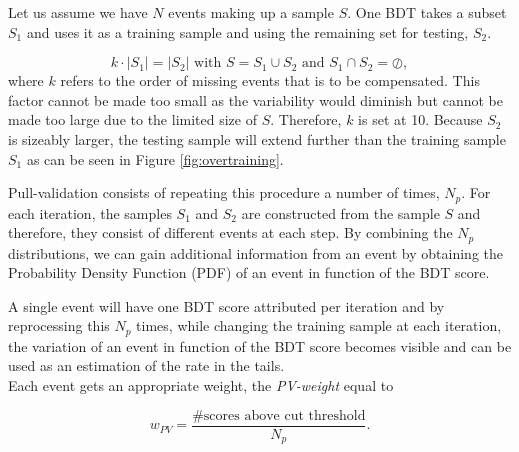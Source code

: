 \noindent Let us assume we have $N$ events making up a sample $S$. One BDT takes a subset $S_1$ and uses it as a training sample and using the remaining set for testing, $S_2$. 

\begin{equation}
k \cdot \left| S_1 \right| = \left| S_2 \right| \textrm{ with } S = S_1 \cup S_2 \textrm{ and } S_1 \cap S_2 = \oslash, 
\end{equation}
where $k$ refers to the order of missing events that is to be compensated. This factor cannot be made too small as the variability would diminish but cannot be made too large due to the limited size of $S$. Therefore, $k$ is set at 10. Because $S_2$ is sizeably larger, the testing sample will extend further than the training sample $S_1$ as can be seen in Figure \ref{fig:overtraining}. 

Pull-validation consists of repeating this procedure a number of times, $N_p$. For each iteration, the samples $S_1$ and $S_2$ are constructed from the sample $S$ and therefore, they consist of different events at each step. By combining the $N_p$ distributions, we can gain additional information from an event by obtaining the Probability Density Function (PDF) of an event in function of the BDT score. 

A single event will have one BDT score attributed per iteration and by reprocessing this $N_p$ times, while changing the training sample at each iteration, the variation of an event in function of the BDT score becomes visible and can be used as an estimation of the rate in the tails.\\

\noindent Each event gets an appropriate weight, the \textit{PV-weight} equal to

\begin{equation}
\label{eq:pullweight}
w_{PV} = \frac{\# \textrm{scores above cut threshold}}{N_p}.
\end{equation}

